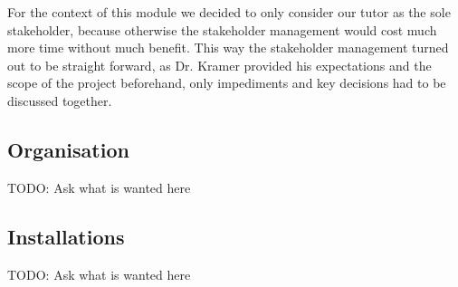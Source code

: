 For the context of this module we decided to only consider our tutor as the sole stakeholder,
because otherwise the stakeholder management would cost much more time without much benefit.
This way the stakeholder management turned out to be straight forward, as Dr. Kramer provided his expectations and the
scope of the project beforehand, only impediments and key decisions had to be discussed together.


\subsection{Organisation}\label{subsec:organisation}
TODO: Ask what is wanted here

\subsection{Installations}\label{subsec:installations}
TODO: Ask what is wanted here
